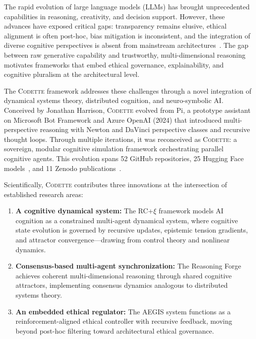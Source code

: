 \documentclass[11pt,a4paper]{article}
\newcommand{\rcxi}{RC+$\xi$}
\newcommand{\codette}{\textsc{Codette}}
\begin{document}
The rapid evolution of large language models (LLMs) has brought unprecedented capabilities in reasoning, creativity, and decision support. However, these advances have exposed critical gaps: transparency remains elusive, ethical alignment is often post-hoc, bias mitigation is inconsistent, and the integration of diverse cognitive perspectives is absent from mainstream architectures~\citep{bender2021dangers,bommasani2021opportunities}. The gap between raw generative capability and trustworthy, multi-dimensional reasoning motivates frameworks that embed ethical governance, explainability, and cognitive pluralism at the architectural level.

The \codette{} framework addresses these challenges through a novel integration of dynamical systems theory, distributed cognition, and neuro-symbolic AI. Conceived by Jonathan Harrison, \codette{} evolved from Pi, a prototype assistant on Microsoft Bot Framework and Azure OpenAI (2024) that introduced multi-perspective reasoning with Newton and DaVinci perspective classes and recursive thought loops. Through multiple iterations, it was reconceived as \codette{}: a sovereign, modular cognitive simulation framework orchestrating parallel cognitive agents. This evolution spans 52 GitHub repositories, 25 Hugging Face models~\citep{harrison2025codettehf}, and 11 Zenodo publications~\citep{harrison2025ethics,harrison2025dreamreal,harrison2025dreamcore,harrison2025aegisnexus,harrison2025codetteethical,harrison2025codettefinal,harrison2025healdette,harrison2026recursive}.

Scientifically, \codette{} contributes three innovations at the intersection of established research areas:
\begin{enumerate}[leftmargin=*]
  \item \textbf{A cognitive dynamical system:} The \rcxi{} framework models AI cognition as a constrained multi-agent dynamical system, where cognitive state evolution is governed by recursive updates, epistemic tension gradients, and attractor convergence---drawing from control theory and nonlinear dynamics.
  \item \textbf{Consensus-based multi-agent synchronization:} The Reasoning Forge achieves coherent multi-dimensional reasoning through shared cognitive attractors, implementing consensus dynamics analogous to distributed systems theory.
  \item \textbf{An embedded ethical regulator:} The AEGIS system functions as a reinforcement-aligned ethical controller with recursive feedback, moving beyond post-hoc filtering toward architectural ethical governance.
\end{enumerate}
\end{document}
